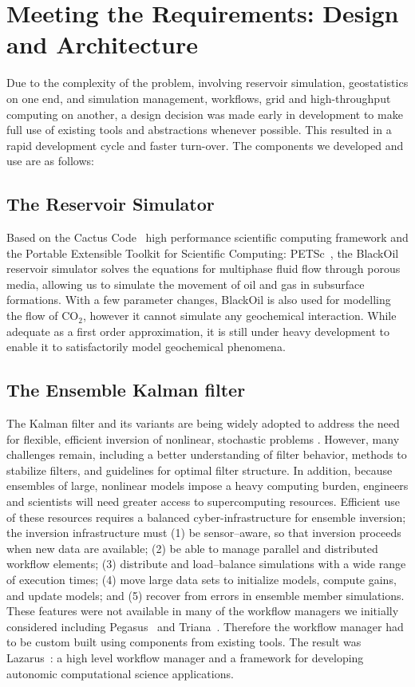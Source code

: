 \documentclass{acm_proc_article-sp}
\begin{document}
\section{Meeting the Requirements: Design and Architecture}

Due to the complexity of the problem, involving reservoir simulation,
geostatistics on one end, and simulation management, workflows, grid
and high-throughput computing on another, a design decision was made
early in development to make full use of existing tools and
abstractions whenever possible. This resulted in a rapid development
cycle and faster turn-over. The components we developed and use are as
follows:

\subsection{The Reservoir Simulator} 

Based on the Cactus Code~\cite{cactus_web} high performance
scientific computing framework and the Portable Extensible Toolkit for
Scientific Computing: PETSc~\cite{PETSc}, the BlackOil reservoir
simulator solves the equations for multiphase fluid flow through
porous media, allowing us to simulate the movement of oil and gas in
subsurface formations. With a few parameter changes, BlackOil is also
used for modelling the flow of CO$_2$, however it cannot simulate any
geochemical interaction. While adequate as a first order
approximation, it is still under heavy development to enable it to
satisfactorily model geochemical phenomena.

\subsection{The Ensemble Kalman filter} 

The Kalman filter and its variants are being widely adopted to address
the need for flexible, efficient inversion of nonlinear, stochastic
problems \cite{DataAssim}. However, many challenges remain,
including a better understanding of filter behavior, methods to
stabilize filters, and guidelines for optimal filter structure. In
addition, because ensembles of large, nonlinear models impose a heavy
computing burden, engineers and scientists will need greater access to
supercomputing resources. Efficient use of these resources requires a
balanced cyber-infrastructure for ensemble inversion; the inversion
infrastructure must (1) be sensor--aware, so that inversion proceeds
when new data are available; (2) be able to manage parallel and
distributed workflow elements; (3) distribute and load--balance
simulations with a wide range of execution times; (4) move large data
sets to initialize models, compute gains, and update models; and (5)
recover from errors in ensemble member simulations. These features
were not available in many of the workflow managers we initially considered
including Pegasus~\cite{Pegasus} and Triana~\cite{Triana}. Therefore
the workflow manager had to be custom built using components from existing
tools. The result was Lazarus~\cite{gmac}: a high level workflow manager
and a framework for developing autonomic computational science applications.
\end{document}
